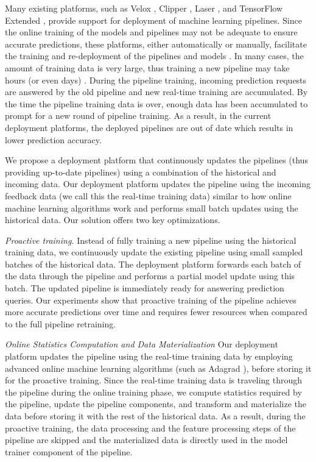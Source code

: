Many existing platforms, such as Velox \cite{crankshaw2014missing}, Clipper \cite{crankshaw2016clipper}, Laser \cite{agarwal2014laser}, and TensorFlow Extended \cite{baylor2017tfx}, provide support for deployment of machine learning pipelines. 
Since the online training of the models and pipelines may not be adequate to ensure accurate predictions, these platforms, either automatically or manually, facilitate the training and re-deployment of the pipelines and models \cite{crankshaw2014missing}.
In many cases, the amount of training data is very large, thus training a new pipeline may take hours (or even days) \cite{baylor2017tfx}.
During the pipeline training, incoming prediction requests are answered by the old pipeline and new real-time training are accumulated.
By the time the pipeline training data is over, enough data has been accumulated to prompt for a new round of pipeline training.
As a result, in the current deployment platforms, the deployed pipelines are out of date which results in lower prediction accuracy.

We propose a deployment platform that continuously updates the pipelines (thus providing up-to-date pipelines) using a combination of the historical and incoming data.
Our deployment platform updates the pipeline using the incoming feedback data (we call this the real-time training data) similar to how online machine learning algorithms work and performs small batch updates using the historical data.
Our solution offers two key optimizations.

\textit{Proactive training.}
Instead of fully training a new pipeline using the historical training data, we continuously update the existing pipeline using small sampled batches of the historical data.
The deployment platform forwards each batch of the data through the pipeline and performs a partial model update using this batch.
The updated pipeline is immediately ready for answering prediction queries.
Our experiments show that proactive training of the pipeline achieves more accurate predictions over time and requires fewer resources when compared to the full pipeline retraining.

\textit{Online Statistics Computation and Data Materialization}
Our deployment platform updates the pipeline using the real-time training data by employing advanced online machine learning algorithms (such as Adagrad \cite{duchi2011adaptive}), before storing it for the proactive training.
Since the real-time training data is traveling through the pipeline during the online training phase, we compute statistics required by the pipeline, update the pipeline components, and transform and materialize the data before storing it with the rest of the historical data.
As a result, during the proactive training, the data processing and the feature processing steps of the pipeline are skipped and the materialized data is directly used in the model trainer component of the pipeline.

